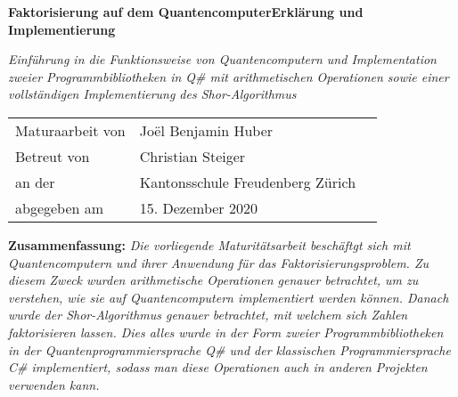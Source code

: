 \begin{titlepage}
    \centering
    {\begin{fullwidth}[leftmargin=-2cm, rightmargin=-2cm, width=\linewidth+4cm]
        \centering
        \huge \hspace{1cm} \textbf{Faktorisierung auf dem Quantencomputer\newline Erklärung und Implementierung}
    \end{fullwidth}}
    \vspace{1cm}
    \begin{minipage}[c]{01\textwidth}
    {\LARGE\textit{Einführung in die Funktionsweise von Quantencomputern und Implementation zweier Programmbibliotheken in Q\# mit arithmetischen Operationen sowie einer vollständigen Implementierung des Shor-Algorithmus}}
    \end{minipage}
    \vspace{1cm}
    \newline
    {\Large \begin{tabular}{l@{}ll}
        Maturaarbeit von \; \; &  Joël Benjamin Huber & \\
        Betreut von & Christian Steiger & \\
        an der & Kantonsschule Freudenberg Zürich & \\
        abgegeben am & 15. Dezember 2020 & \\
    \end{tabular}
    }
    \vspace{3cm}
    \newline
    \begin{minipage}[c]{1\textwidth}
    {
        \textbf{Zusammenfassung: } \textit{Die vorliegende Maturitätsarbeit beschäftgt sich mit Quantencomputern und ihrer Anwendung für das Faktorisierungsproblem. Zu diesem Zweck wurden arithmetische Operationen genauer betrachtet, um zu verstehen, wie sie auf Quantencomputern implementiert werden können. Danach wurde der Shor-Algorithmus genauer betrachtet, mit welchem sich Zahlen faktorisieren lassen. Dies alles wurde in der Form zweier Programmbibliotheken in der Quantenprogrammiersprache Q\# und der klassischen Programmiersprache C\# implementiert, sodass man diese Operationen auch in anderen Projekten verwenden kann. }
    }
    \end{minipage}
\end{titlepage}